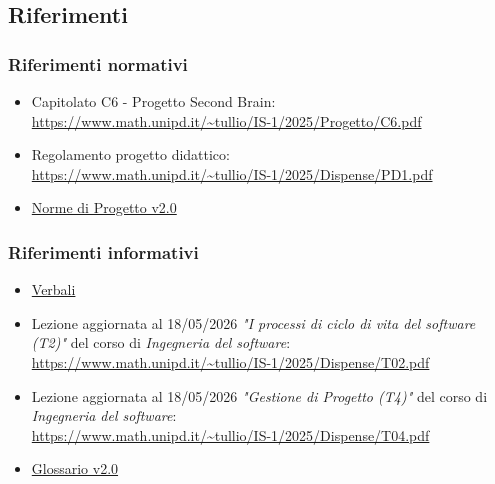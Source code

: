 \documentclass[a4paper,10pt]{article}
\begin{document}
\subsection{Riferimenti}
\subsubsection{Riferimenti normativi}
\begin{itemize}
  \item Capitolato C6 - Progetto Second Brain: \\  \url{https://www.math.unipd.it/~tullio/IS-1/2025/Progetto/C6.pdf}
  \item Regolamento progetto didattico: \\ \url{https://www.math.unipd.it/~tullio/IS-1/2025/Dispense/PD1.pdf}
  \item \href{https://tool-8.github.io/Documentazione-SWE/pb/Norme_di_Progetto_v2.0.pdf}{Norme di Progetto v2.0}
\end{itemize}
\subsubsection{Riferimenti informativi}
\begin{itemize}
  \item \href{https://tool-8.github.io/Documentazione-SWE/}{Verbali}
  \item Lezione aggiornata al 18/05/2026 \textit{"I processi di ciclo di vita del software (T2)"} del corso di \textit{Ingegneria del software}: \\ \url{https://www.math.unipd.it/~tullio/IS-1/2025/Dispense/T02.pdf}
  \item Lezione aggiornata al 18/05/2026 \textit{"Gestione di Progetto (T4)"} del corso di \textit{Ingegneria del software}: \\ \url{https://www.math.unipd.it/~tullio/IS-1/2025/Dispense/T04.pdf}
  \item \href{https://tool-8.github.io/Documentazione-SWE/glossario/Glossario.pdf}{Glossario v2.0}
\end{itemize}

\newpage
\end{document}
